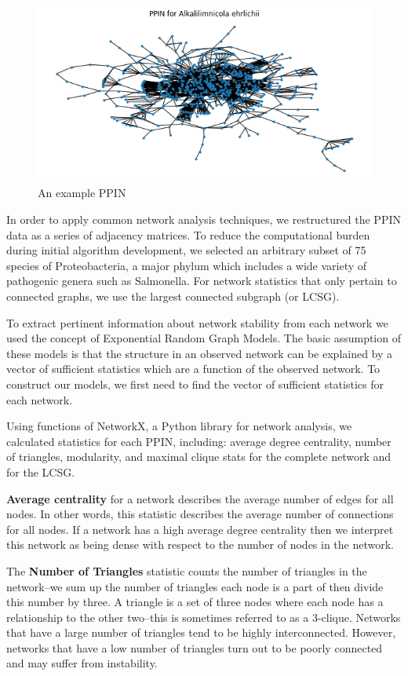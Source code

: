 \documentclass[12pt]{article}
\begin{document}
\begin{figure}
\centering
  \includegraphics[width=.4\linewidth]{PPIN_fig1}
  \caption{An example PPIN}
  \label{fig:PPIN_fig1}
\end{figure}

In order to apply common network analysis techniques, we restructured the PPIN data as a series of adjacency matrices. To reduce the computational burden during initial algorithm development, we selected an arbitrary subset of 75 species of Proteobacteria, a major phylum which includes a wide variety of pathogenic genera such as Salmonella. For network statistics that only pertain to connected graphs, we use the largest connected subgraph (or LCSG).

To extract pertinent information about network stability from each network we used the concept of Exponential Random Graph Models. The basic assumption of these models is that the structure in an observed network can be explained by a vector of sufficient statistics which are a function of the observed network. To construct our models, we first need to find the vector of sufficient statistics for each network.

Using functions of NetworkX, a Python library for network analysis, we calculated statistics for each PPIN, including: average degree centrality, number of triangles, modularity, and maximal clique stats for the complete network and for the LCSG. 

\textbf{Average centrality} for a network describes the average number of edges for all nodes. In other words, this statistic describes the average number of connections for all nodes. If a network has a high average degree centrality then we interpret this network as being dense with respect to the number of nodes in the network.

The \textbf{Number of Triangles} statistic counts the number of triangles in the network--we sum up the number of triangles each node is a part of then divide this number by three. A triangle is a set of three nodes where each node has a relationship to the other two--this is sometimes referred to as a 3-clique. Networks that have a large number of triangles tend to be highly interconnected. However, networks that have a low number of triangles turn out to be poorly connected and may suffer from instability.
\end{document}
